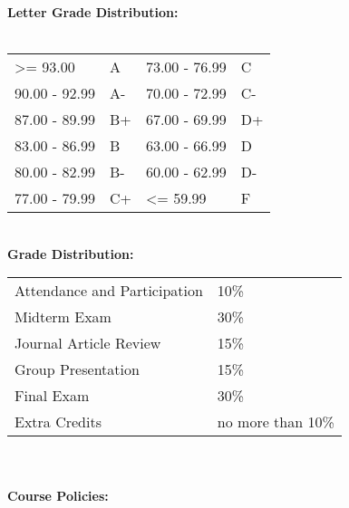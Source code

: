 \documentclass[11pt]{article}
\begin{document}

\textbf {\large Letter Grade Distribution:} \\\\
\hspace*{40mm}
\begin{tabular}{ l l | l l }
\textgreater= 93.00 & A & 73.00 - 76.99 & C \\
90.00 - 92.99 & A-  & 70.00 - 72.99 & C- \\
87.00 - 89.99 & B+  & 67.00 - 69.99 & D+ \\
83.00 - 86.99 & B  & 63.00 - 66.99 & D \\
80.00 - 82.99 & B-  & 60.00 - 62.99 & D- \\
77.00 - 79.99 & C+  & \textless= 59.99 & F \\
\end{tabular} \\
\newpage
\textbf {\large Grade Distribution:} \\
\hspace*{40mm}
\begin{tabular}{ l l }
Attendance and Participation & 10\% \\
Midterm Exam  & 30\% \\
Journal Article Review & 15\% \\
Group Presentation & 15\% \\
Final Exam  & 30\% \\
Extra Credits  & no more than 10\%
\end{tabular} \\\\
\textbf {\large Course Policies:}
\end{document}
